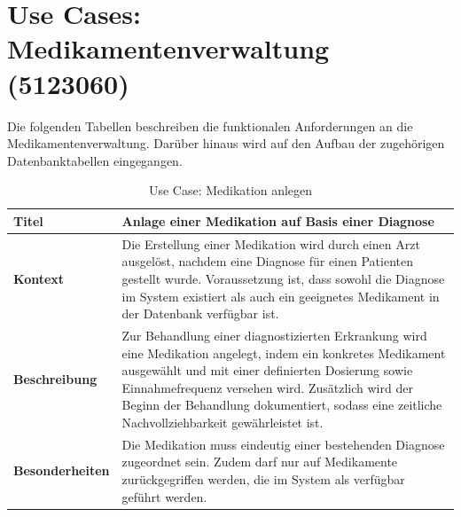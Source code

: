 \section{Use Cases: Medikamentenverwaltung (5123060)}

Die folgenden Tabellen beschreiben die funktionalen Anforderungen an die Medikamentenverwaltung. Darüber hinaus wird auf den Aufbau der zugehörigen Datenbanktabellen
eingegangen.
\begin{table}[H]
\centering
\renewcommand{\arraystretch}{1.4}
\begin{tabularx}{\textwidth}{|p{4cm}|X|}
\hline
\textbf{Titel} & \textbf{Anlage einer Medikation auf Basis einer Diagnose} \\
\hline
\textbf{Kontext} &
Die Erstellung einer Medikation wird durch einen Arzt ausgelöst, nachdem eine Diagnose für einen Patienten gestellt wurde. Voraussetzung ist, dass sowohl die Diagnose im System existiert als auch ein geeignetes Medikament in der Datenbank verfügbar ist. \\
\hline
\textbf{Beschreibung} &
Zur Behandlung einer diagnostizierten Erkrankung wird eine Medikation angelegt, indem ein konkretes Medikament ausgewählt und mit einer definierten Dosierung sowie Einnahmefrequenz versehen wird. Zusätzlich wird der Beginn der Behandlung dokumentiert, sodass eine zeitliche Nachvollziehbarkeit gewährleistet ist. \\
\hline
\textbf{Besonderheiten} &
Die Medikation muss eindeutig einer bestehenden Diagnose zugeordnet sein. Zudem darf nur auf Medikamente zurückgegriffen werden, die im System als verfügbar geführt werden. \\
\hline
\end{tabularx}
\caption{Use Case: Medikation anlegen}
\end{table}
